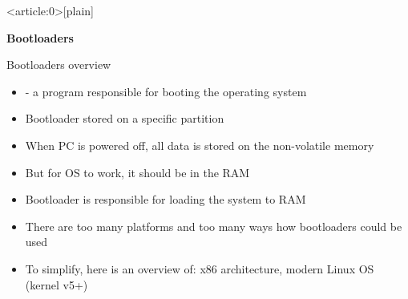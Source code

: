 \documentclass[usenames,dvipsnames,10pt,aspectratio=169]{beamer}
\begin{document}
{ %
    \begin{frame}<article:0>[plain]
        {\huge \textbf{Bootloaders}}
     \end{frame}
}

\begin{frame}{Bootloaders overview}
    \begin{itemize}
        \item {}- a program responsible for booting the operating system
        \item Bootloader stored on a specific partition
        \item When PC is powered off, all data is stored on the non-volatile memory
        \item But for OS to work, it should be in the RAM
        \item Bootloader is responsible for loading the system to RAM
        \item There are too many platforms and too many ways how bootloaders could be used
        \item To simplify, here is an overview of: x86 architecture, modern Linux OS (kernel v5+)
    \end{itemize}
\end{frame}
\end{document}
